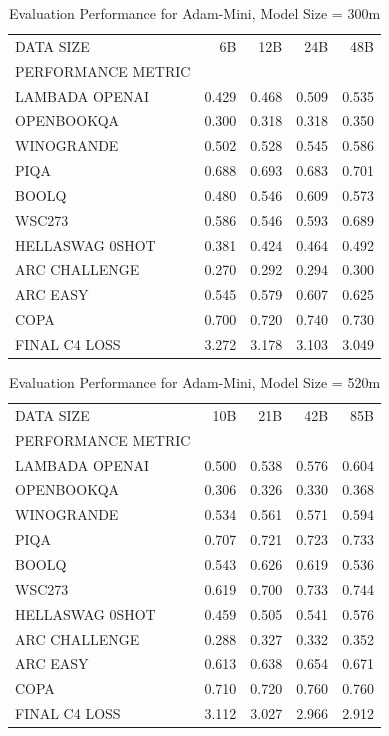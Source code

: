 \begin{table}
[H] \centering \caption{Evaluation Performance for Adam-Mini, Model Size = 300m}
\label{tab:eval-performance-adam-mini-300M}
\begin{tabular}{lrrrr}
\toprule
DATA SIZE & 6B & 12B & 24B & 48B \\
PERFORMANCE METRIC &  &  &  &  \\
\midrule
LAMBADA OPENAI & 0.429 & 0.468 & 0.509 & 0.535 \\
OPENBOOKQA & 0.300 & 0.318 & 0.318 & 0.350 \\
WINOGRANDE & 0.502 & 0.528 & 0.545 & 0.586 \\
PIQA & 0.688 & 0.693 & 0.683 & 0.701 \\
BOOLQ & 0.480 & 0.546 & 0.609 & 0.573 \\
WSC273 & 0.586 & 0.546 & 0.593 & 0.689 \\
HELLASWAG 0SHOT & 0.381 & 0.424 & 0.464 & 0.492 \\
ARC CHALLENGE & 0.270 & 0.292 & 0.294 & 0.300 \\
ARC EASY & 0.545 & 0.579 & 0.607 & 0.625 \\
COPA & 0.700 & 0.720 & 0.740 & 0.730 \\
FINAL C4 LOSS & 3.272 & 3.178 & 3.103 & 3.049 \\
\bottomrule
\end{tabular}
\end{table}


\begin{table}
[H] \centering \caption{Evaluation Performance for Adam-Mini, Model Size = 520m}
\label{tab:eval-performance-adam-mini-520M}
\begin{tabular}{lrrrr}
\toprule
DATA SIZE & 10B & 21B & 42B & 85B \\
PERFORMANCE METRIC &  &  &  &  \\
\midrule
LAMBADA OPENAI & 0.500 & 0.538 & 0.576 & 0.604 \\
OPENBOOKQA & 0.306 & 0.326 & 0.330 & 0.368 \\
WINOGRANDE & 0.534 & 0.561 & 0.571 & 0.594 \\
PIQA & 0.707 & 0.721 & 0.723 & 0.733 \\
BOOLQ & 0.543 & 0.626 & 0.619 & 0.536 \\
WSC273 & 0.619 & 0.700 & 0.733 & 0.744 \\
HELLASWAG 0SHOT & 0.459 & 0.505 & 0.541 & 0.576 \\
ARC CHALLENGE & 0.288 & 0.327 & 0.332 & 0.352 \\
ARC EASY & 0.613 & 0.638 & 0.654 & 0.671 \\
COPA & 0.710 & 0.720 & 0.760 & 0.760 \\
FINAL C4 LOSS & 3.112 & 3.027 & 2.966 & 2.912 \\
\bottomrule
\end{tabular}
\end{table}





